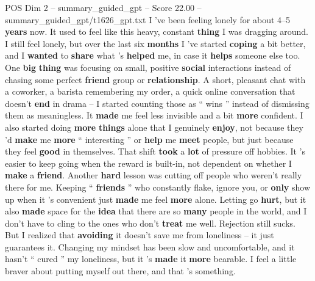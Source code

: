\begin{textsample}{POS Dim 2 – summary\_guided\_gpt – Score 22.00 – summary\_guided\_gpt/t1626\_gpt.txt}  \label{ex:f2_pos_017}
I ’ve been feeling lonely for about 4–5 \textbf{years} now.
It used to feel like this heavy, constant \textbf{thing} I was dragging around.
I still feel lonely, but over the last six \textbf{months} I ’ve started \textbf{coping} a bit better, and I \textbf{wanted} to \textbf{share} what ’s \textbf{helped} me, in case it \textbf{helps} someone else too.
One \textbf{big} \textbf{thing} was focusing on small, positive \textbf{social} interactions instead of chasing some perfect \textbf{friend} group or \textbf{relationship}.
A short, pleasant chat with a coworker, a barista remembering my order, a quick online conversation that doesn't \textbf{end} in drama – I started counting those as “ wins ” instead of dismissing them as meaningless.
It \textbf{made} me feel less invisible and a bit \textbf{more} confident.
I also started doing \textbf{more} \textbf{things} alone that I genuinely \textbf{enjoy}, not because they ’d \textbf{make} me \textbf{more} “ interesting ” or \textbf{help} me \textbf{meet} people, but just because they feel \textbf{good} in themselves.
That shift \textbf{took} a \textbf{lot} of pressure off hobbies.
It ’s easier to keep going when the reward is built-in, not dependent on whether I \textbf{make} a \textbf{friend}.
Another \textbf{hard} lesson was cutting off people who weren't really there for me.
Keeping “ \textbf{friends} ” who constantly flake, ignore you, or \textbf{only} show up when it ’s convenient just \textbf{made} me feel \textbf{more} alone.
Letting go \textbf{hurt}, but it also \textbf{made} space for the \textbf{idea} that there are so \textbf{many} people in the world, and I don't have to cling to the ones who don't \textbf{treat} me well.
Rejection still sucks.
But I realized that \textbf{avoiding} it doesn't save me from loneliness – it just guarantees it.
Changing my mindset has been slow and uncomfortable, and it hasn't “ cured ” my loneliness, but it ’s \textbf{made} it \textbf{more} bearable.
I feel a little braver about putting myself out there, and that ’s something.

\end{textsample}
